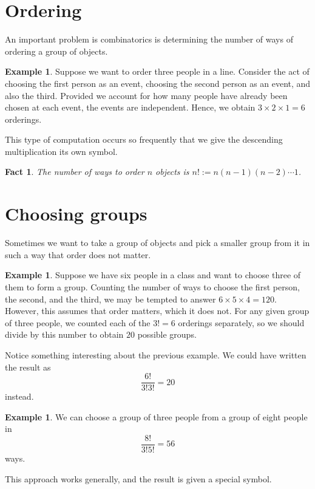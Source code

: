 \documentclass{book}
\theoremstyle{plain}
\newtheorem{fact}[theorem]{Fact}
\theoremstyle{definition}
\newtheorem{example}[theorem]{Example}
\begin{document}
\section{Ordering}
An important problem is combinatorics is determining the number of ways of ordering a group of objects.

\begin{example}
Suppose we want to order three people in a line. Consider the act of choosing the first person as an event, choosing the second person as an event, and also the third. Provided we account for how many people have already been chosen at each event, the events are independent. Hence, we obtain $3 \times 2 \times 1 = 6$ orderings.
\end{example}

This type of computation occurs so frequently that we give the descending multiplication its own symbol.

\begin{fact}
The number of ways to order $n$ objects is $n! := n(n-1)(n-2) \cdots 1$.
\end{fact}

\section{Choosing groups}
Sometimes we want to take a group of objects and pick a smaller group from it in such a way that order does not matter.

\begin{example}
Suppose we have six people in a class and want to choose three of them to form a group. Counting the number of ways to choose the first person, the second, and the third, we may be tempted to answer $6 \times 5 \times 4 = 120$. However, this assumes that order matters, which it does not. For any given group of three people, we counted each of the $3! = 6$ orderings separately, so we should divide by this number to obtain $20$ possible groups.
\end{example}

Notice something interesting about the previous example. We could have written the result as $$\frac{6!}{3!3!} = 20$$ instead.

\begin{example}
We can choose a group of three people from a group of eight people in $$\frac{8!}{3!5!} = 56$$ ways.
\end{example}

This approach works generally, and the result is given a special symbol.
\end{document}
